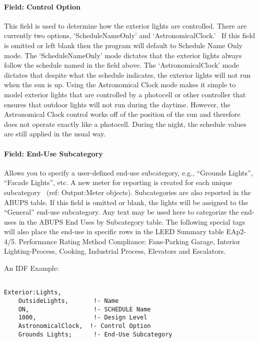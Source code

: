 \paragraph{Field: Control Option}\label{field-control-option}

This field is used to determine how the exterior lights are controlled. There are currently two options, `ScheduleNameOnly' and `AstronomicalClock.'~ If this field is omitted or left blank then the program will default to Schedule Name Only mode. The `ScheduleNameOnly' mode dictates that the exterior lights always follow the schedule named in the field above. The `AstronomicalClock' mode dictates that despite what the schedule indicates, the exterior lights will not run when the sun is up. Using the Astronomical Clock mode makes it simple to model exterior lights that are controlled by a photocell or other controller that ensures that outdoor lights will not run during the daytime. However, the Astronomical Clock control works off of the position of the sun and therefore does not operate exactly like a photocell. During the night, the schedule values are still applied in the usual way.

\paragraph{Field: End-Use Subcategory}\label{field-end-use-subcategory-000}

Allows you to specify a user-defined end-use subcategory, e.g., ``Grounds Lights'', ``Facade Lights'', etc. A new meter for reporting is created for each unique subcategory~ (ref: Output:Meter objects). Subcategories are also reported in the ABUPS table. If this field is omitted or blank, the lights will be assigned to the ``General'' end-use subcategory. Any text may be used here to categorize the end-uses in the ABUPS End Uses by Subcategory table. The following special tags will also place the end-use in specific rows in the LEED Summary table EAp2-4/5. Performance Rating Method Compliance:  Fans-Parking Garage, Interior Lighting-Process, Cooking, Industrial Process, Elevators and Escalators.

An IDF Example:

\begin{lstlisting}

Exterior:Lights,
    OutsideLights,       !- Name
    ON,                  !- SCHEDULE Name
    1000,                !- Design Level
    AstronomicalClock,  !- Control Option
    Grounds Lights;      !- End-Use Subcategory
\end{lstlisting}


